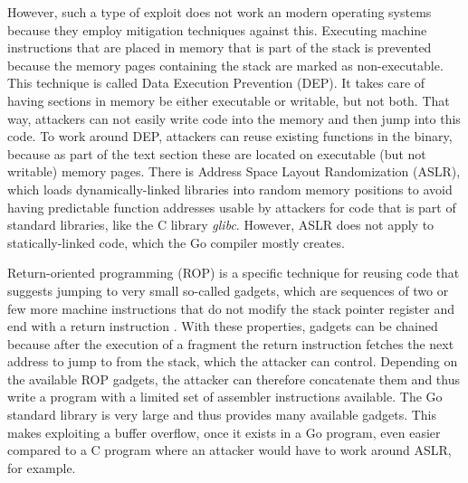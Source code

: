 However, such a type of exploit does not work an modern operating systems because they employ mitigation techniques
against this.
Executing machine instructions that are placed in memory that is part of the stack is prevented because the memory pages
containing the stack are marked as non-executable.
This technique is called Data Execution Prevention (\acrshort{DEP}).
It takes care of having sections in memory be either executable or writable, but not both.
That way, attackers can not easily write code into the memory and then jump into this code.
To work around \acrshort{DEP}, attackers can reuse existing functions in the binary, because as part of the text section
these are located on executable (but not writable) memory pages.
There is Address Space Layout Randomization (\acrshort{ASLR}), which loads dynamically-linked libraries into random
memory positions to avoid having predictable function addresses usable by attackers for code that is part of standard
libraries, like the C library \textit{glibc}.
However, \acrshort{ASLR} does not apply to statically-linked code, which the Go compiler mostly creates.

Return-oriented programming (\acrshort{ROP}) is a specific technique for reusing code that suggests jumping to very
small so-called gadgets, which are sequences of two or few more machine instructions that do not modify the stack
pointer register and end with a return instruction .
With these properties, gadgets can be chained because after the execution of a fragment the return instruction fetches
the next address to jump to from the stack, which the attacker can control.
Depending on the available \acrshort{ROP} gadgets, the attacker can therefore concatenate them and thus write a program
with a limited set of assembler instructions available.
The Go standard library is very large and thus provides many available gadgets.
This makes exploiting a buffer overflow, once it exists in a Go program, even easier compared to a C program where an
attacker would have to work around \acrshort{ASLR}, for example.

